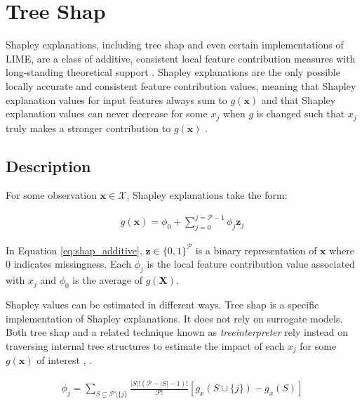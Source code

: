 \documentclass[sigconf, review]{acmart}
\begin{document}
\section{Tree Shap} \label{sec:shap}

Shapley explanations, including tree shap and even certain implementations of LIME, are a class of additive, consistent local feature contribution measures with long-standing theoretical support \cite{shapley}. Shapley explanations are the only possible locally accurate and consistent feature contribution values, meaning that Shapley explanation values for input features always sum to $g(\mathbf{x})$ and that Shapley explanation values can never decrease for some $x_j$ when $g$ is changed such that $x_j$ truly makes a stronger contribution to $g(\mathbf{x})$ \cite{shapley}. 

\subsection{Description}

For some observation $\mathbf{x} \in \mathcal{X}$, Shapley explanations take the form:

\begin{equation}
\label{eq:shap_additive}
\begin{aligned}
g(\mathbf{x}) = \phi_0 + \sum_{j=0}^{j=\mathcal{P} - 1} \phi_j \mathbf{z}_j
\end{aligned}
\end{equation}

\noindent In Equation \ref{eq:shap_additive}, $\mathbf{z} \in \{0,1\}^\mathcal{P}$ is a binary representation of $\mathbf{x}$ where 0 indicates missingness. Each $\phi_j$ is the local feature contribution value associated with $x_j$ and $\phi_0$ is the average of $g(\mathbf{X})$. 

Shapley values can be estimated in different ways. Tree shap is a specific implementation of Shapley explanations. It does not rely on surrogate models. Both tree shap and a related technique known as \textit{treeinterpreter} rely instead on traversing internal tree structures to estimate the impact of each $x_j$ for some $g(\mathbf{x})$ of interest \cite{tree_shap}, \cite{treeinterpreter}.

\begin{equation}
\label{eq:shap_contrib}
\begin{aligned}
\phi_{j} = \sum_{S \subseteq \mathcal{P} \setminus \{j\}}\frac{|S|!(\mathcal{P} -|S| -1)!}{\mathcal{P}!}[g_x(S \cup \{j\}) - g_x(S)]
\end{aligned}
\end{equation}
\end{document}
